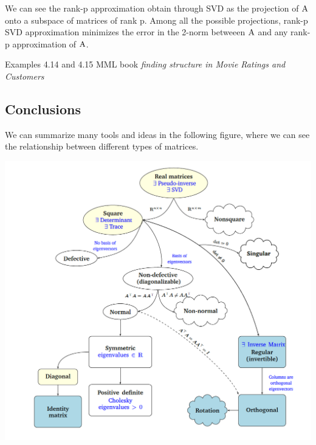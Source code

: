 We can see the rank-p approximation obtain through SVD as the projection of $\mathrm{A}$ onto a subspace of matrices of rank p. Among all the possible projections, rank-p SVD approximation minimizes the error in the 2-norm betweeen $\mathrm{A}$ and any rank-p approximation of $\mathrm{A}$.

Examples 4.14 and 4.15 MML book \textit{finding structure in Movie Ratings and Customers}

\subsection{Conclusions}

We can summarize many tools and ideas in the following figure, where we can see the relationship between different types of matrices.

\includegraphics[width=0.7 \textwidth]{sections/images/matrix.png}